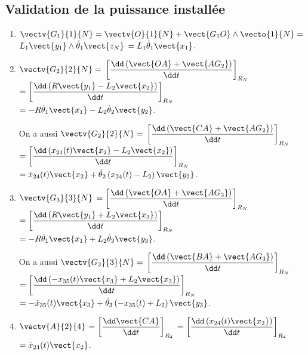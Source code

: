 \subsection*{Validation de la puissance installée}
\ifprof
\begin{corrige}
\begin{enumerate}
\item $\vectv{G_1}{1}{N}=\vectv{O}{1}{N}+\vect{G_1 O}\wedge \vecto{1}{N}=$ $L_1\vect{y_1}\wedge \dot{\theta}_1\vect{z_N}$ $=L_1 \dot{\theta}_1\vect{x_1}$.
\item $\vectv{G_2}{2}{N}=$ $\left[  \dfrac{\dd \left( \vect{OA} + \vect{AG_2}\right)}{\dd t}\right]_{R_N}$ 
$=\left[ \dfrac{\dd \left( R\vect{y_1}  -L_2 \vect{x_2}\right)}{\dd t}\right]_{R_N}$ $= -R\dot{\theta}_1\vect{x_1}  -L_2 \dot{\theta}_2\vect{y_2}$. 

On a aussi $\vectv{G_2}{2}{N}=$ $\left[  \dfrac{\dd \left( \vect{CA} + \vect{AG_2}\right)}{\dd t}\right]_{R_N}$ 
$=\left[ \dfrac{\dd \left(  x_{24}(t)\vect{x_2}  -L_2 \vect{x_2}\right)}{\dd t}\right]_{R_N}$ $=  \dot{x}_{24}(t)  \vect{x_2}+\dot{\theta}_2\left(  x_{24}(t)  -L_2 \right)\vect{y_2}$.

\item $\vectv{G_3}{3}{N}$  $=\left[  \dfrac{\dd \left( \vect{OA} + \vect{AG_3}\right)}{\dd t}\right]_{R_N}$ 
$=\left[ \dfrac{\dd \left( R\vect{y_1} + L_2 \vect{x_3}\right)}{\dd t}\right]_{R_N}$ $= -R\dot{\theta}_1\vect{x_1}  +L_2 \dot{\theta}_3\vect{y_3}$. 


On a aussi $\vectv{G_3}{3}{N}=$ $\left[  \dfrac{\dd \left( \vect{BA} + \vect{AG_3}\right)}{\dd t}\right]_{R_N}$ 
$=\left[ \dfrac{\dd \left(  -x_{35}(t)\vect{x_3}  +L_2 \vect{x_3}\right)}{\dd t}\right]_{R_N}$ $= - \dot{x}_{35}(t)  \vect{x_3}+\dot{\theta}_3\left(  -x_{35}(t)  +L_2 \right)\vect{y_3}$.


\item $\vectv{A}{2}{4}$ $=\left[  \dfrac{\dd  \vect{CA} }{\dd t}\right]_{R_4}$  $=\left[  \dfrac{\dd \left( x_{24}(t)\vect{x_2} \right)}{\dd t}\right]_{R_4}$ $= \dot{x}_{24}(t)\vect{x_2}$.
\end{enumerate}
\end{corrige}
\else
\fi


